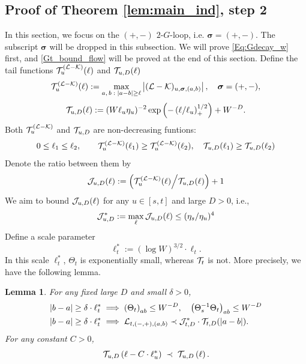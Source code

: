 \documentclass[10pt,reqno]{article}
\theoremstyle{plain} %
\newtheorem{lemma}[theorem]{Lemma}
\theoremstyle{remark}
\numberwithin{equation}{section}
\begin{document}
 
  




\subsection{Proof of Theorem \ref{lem:main_ind}, step 2}
In this section,  we focus on the $(+,-)$ $2$-$G$-loop, i.e. $\boldsymbol{\sigma}=(+,-)$. The subscript $\boldsymbol{\sigma}$ will be dropped  in this subsection.  We will prove \eqref{Eq:Gdecay_w} first, and  \eqref{Gt_bound_flow} will be proved at the end of this  section. 
Define the tail functions ${\cal T}^{(\cal L-K)}_u (\ell)$ and ${\cal T}_{u,D} (\ell)$ 
\begin{equation}\label{def_WTu}
      {\cal T}^{(\cal L-K)}_u (\ell):= \max_{a,\,b\; : \; |a-b|\ge \ell} \left| ({\cal L-K})_{u,  \boldsymbol{\sigma},  ( a, b)}\right|,\quad  \boldsymbol{\sigma}=(+,-),
\end{equation}
\begin{equation}\label{def_WTuD}
{\cal T} _{u, D} (\ell) :=  (W\ell_u\eta_u)^{-2}
\exp \left(- \left( \ell /\ell_u \right)_+^{1/2} \right)+W^{-D}.
\end{equation} 
Both  ${\cal T}^{(\cal L-K)}_u$ and ${\cal T} _{u, D}$ are non-decreasing funtions:
 $$
 0\le \ell_1\le \ell_2,\quad \quad 
 {\cal T}^{(\cal L-K)}_u (\ell_1)\ge {\cal T}^{(\cal L-K)}_u (\ell_2),\quad {\cal T} _{u,D} (\ell_1)\ge{\cal T} _{u,D}(\ell_2)
 $$
 Denote  the ratio between them by  %
\begin{equation}\label{def_Ju}
     {\cal J} _{u,D} (\ell):=   \left({\cal T}^{(\cal L-K)}_u (\ell) \Big/{\cal T}_{u,D} (\ell)\right)+1
\end{equation} 
We aim to bound $ {\cal J} _{u,D} (\ell)$ for any $u\in [s,t]$ and large $D>0$, i.e., 
 \begin{align}\label{shoellJJ}
    {\cal J}^* _{u,D} :=\max_{\ell}   {\cal J} _{u,D} (\ell)\le (\eta_s/\eta_u)^4 
  \end{align}
Define a  scale parameter 
$$
  \ell^{*}_t := (\log W)^{3/2}\cdot \ell_t .
$$
In this scale $\ell_t^*$,  $\Theta_t$ is exponentially small, whereas ${\cal T}_t$ is not. 
More precisely, we have the following lemma.  
\begin{lemma}\label{lem_dec_calE_0}
For any fixed large $D$ and small $\delta>0$,  
 \begin{align}
 \label{Kell*}
   |b -a|\ge \delta \cdot \ell_t^* &\implies 
   \left({\Theta}_t\right)_{ab } \le W^{-D} ,\quad    \left({\Theta}_s^{-1}{\Theta}_t\right)_{ab } \le W^{-D}
   \\
  |b -a|\ge \delta \cdot \ell_t^* 
 & \implies  {\cal L}_{t, (-,+),(a, b)} \prec {\cal J}^*_{t,D}\cdot{\cal T}_{t,D}(|a-b|) . \label{auiwii}
\end{align}
For any constant $C>0$, \begin{equation}\label{Tell*}
       { {\cal T}_{u,D} \left(\ell-C\cdot \ell_u^*\right)}\;\prec \;  {\cal T}_{u,D} \left(\ell \right).
\end{equation} 

\end{lemma}
\end{document}
